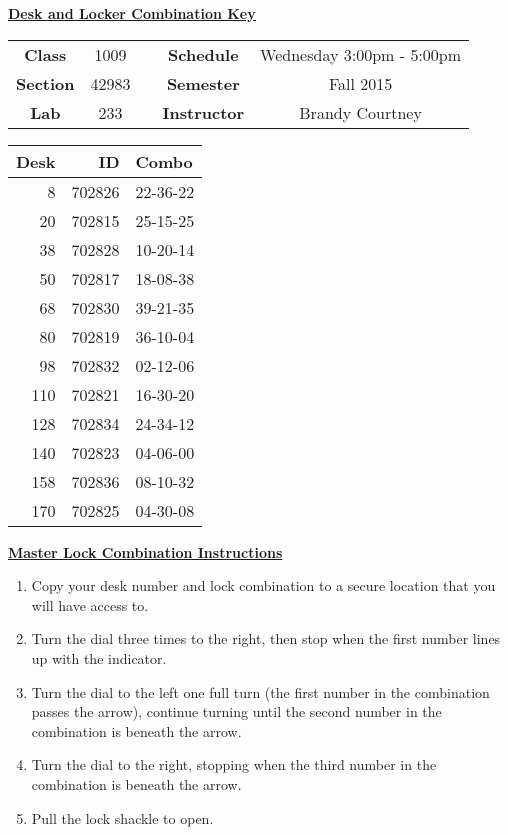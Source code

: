 \documentclass[12pt]{article}
\begin{document}
\thispagestyle{empty}

\begin{center}
	{\huge\textbf{\underline{ Desk and Locker Combination Key}}}
\end{center}


\begin{table}[h]
  \centering
  \begin{tabular}{ccccc}

  \textbf{Class} & 1009 & {\qquad} &\textbf{Schedule} & Wednesday 3:00pm - 5:00pm \\
  \textbf{Section} & 42983 & {\qquad} & \textbf{Semester} & Fall 2015 \\
  \textbf{Lab} & 233 & {\qquad} & \textbf{Instructor} & Brandy Courtney \\
  \end{tabular}
\end{table}
 \vspace{0.5in}
\begin{minipage}{0.4\textwidth}

\begin{tabular}{rrl}
\toprule
 Desk &      ID &     Combo \\
\midrule
    8 &  702826 &  22-36-22 \\
   20 &  702815 &  25-15-25 \\
   38 &  702828 &  10-20-14 \\
   50 &  702817 &  18-08-38 \\
   68 &  702830 &  39-21-35 \\
   80 &  702819 &  36-10-04 \\
   98 &  702832 &  02-12-06 \\
  110 &  702821 &  16-30-20 \\
  128 &  702834 &  24-34-12 \\
  140 &  702823 &  04-06-00 \\
  158 &  702836 &  08-10-32 \\
  170 &  702825 &  04-30-08 \\
\bottomrule
\end{tabular}


\end{minipage}
\begin{minipage}{0.4\textwidth}
\underline{{\large \textbf{Master Lock Combination Instructions}}}
\begin{enumerate}
\item Copy your desk number and lock combination to a secure location that you will have access to.
\item Turn the dial three times to the right, then stop when the first number lines up with the indicator.
\item Turn the dial to the left one full turn (the first number in the combination passes the arrow), continue turning until the second number in the combination is beneath the arrow.
\item Turn the dial to the right, stopping when the third number in the combination is beneath the arrow.
\item Pull the lock shackle to open.
\end{enumerate}
\end{minipage}
\end{document}
